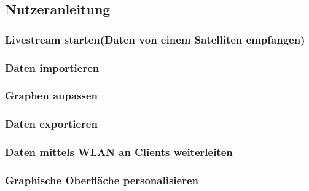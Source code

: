 \subsection{Nutzeranleitung}
\subsubsection{Livestream starten(Daten von einem Satelliten empfangen)}
\subsubsection{Daten importieren}
\subsubsection{Graphen anpassen}
\subsubsection{Daten exportieren}
\subsubsection{Daten mittels WLAN an Clients weiterleiten}
\subsubsection{Graphische Oberfläche personalisieren}